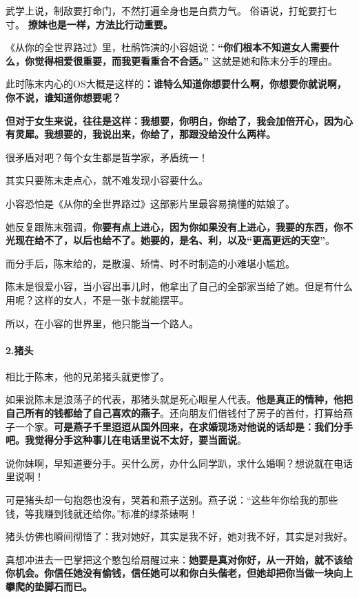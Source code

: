 \documentclass[UTF8,a4paper,8pt]{ctexbook}
\begin{document}
				武学上说，制敌要打命门，不然打遍全身也是白费力气。
				俗语说，打蛇要打七寸。
				\textbf{撩妹也是一样，方法比行动重要。}
		
		
				《从你的全世界路过》里，杜鹃饰演的小容姐说：\textbf{“你们根本不知道女人需要什么，你觉得相爱很重要，而我更看重合不合适。”}
				这就是她和陈末分手的理由。
				
				此时陈末内心的OS大概是这样的\textbf{：谁特么知道你想要什么啊，你想要你就说啊，你不说，谁知道你想要呢？}
			
			\textbf{但对于女生来说，往往是这样：我想要，你明白，你给了，我会加倍开心，因为心有灵犀。我想要的，我说出来，你给了，那跟没给没什么两样。}
			 
				很矛盾对吧？每个女生都是哲学家，矛盾统一！
				
				其实只要陈末走点心，就不难发现小容要什么。
				
				小容恐怕是《从你的全世界路过》这部影片里最容易搞懂的姑娘了。
				
				她反复跟陈末强调，\textbf{你要有点上进心，因为你如果没有上进心，我要的东西，你不光现在给不了，以后也给不了。她要的，是名、利，以及“更高更远的天空”}。
				
				而分手后，陈末给的，是散漫、矫情、时不时制造的小难堪小尴尬。
				
				陈末是很爱小容，当小容出事儿时，他拿出了自己的全部家当给了她。但是有什么用呢？这样的女人，不是一张卡就能摆平。
				
				所以，在小容的世界里，他只能当一个路人。
			
			\paragraph{2.猪头}
				相比于陈末，他的兄弟猪头就更惨了。
				
				如果说陈末是浪荡子的代表，那猪头就是死心眼星人代表。\textbf{他是真正的情种，他把自己所有的钱都给了自己喜欢的燕子}。还向朋友们借钱付了房子的首付，打算给燕子一个家。\textbf{可是燕子千里迢迢从国外回来，在求婚现场对他说的话却是：我们分手吧。我觉得分手这种事儿在电话里说不太好，要当面说}。
				
				说你妹啊，早知道要分手。买什么房，办什么同学趴，求什么婚啊？想说就在电话里说啊！
				
				可是猪头却一句抱怨也没有，哭着和燕子送别。燕子说：“这些年你给我的那些钱，等我赚到钱就还给你。”标准的绿茶婊啊！
				
				猪头仿佛也瞬间彻悟了：我对她好，其实是我不好，她对我不好，其实是对我好。
				
				真想冲进去一巴掌把这个憨包给扇醒过来：\textbf{她要是真对你好，从一开始，就不该给你机会。你信任她没有偷钱，信任她可以和你白头偕老，但她却把你当做一块向上攀爬的垫脚石而已。}
				
\end{document}

